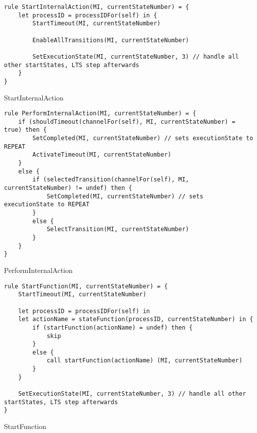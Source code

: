 \begin{listing}[H]
\begin{verbatim}
rule StartInternalAction(MI, currentStateNumber) = {
    let processID = processIDFor(self) in {
        StartTimeout(MI, currentStateNumber)

        EnableAllTransitions(MI, currentStateNumber)

        SetExecutionState(MI, currentStateNumber, 3) // handle all other startStates, LTS step afterwards
    }
}
\end{verbatim}
\caption{StartInternalAction}
\label{lst:asm:StartInternalAction}
\end{listing}




\begin{listing}[H]
\begin{verbatim}
rule PerformInternalAction(MI, currentStateNumber) = {
    if (shouldTimeout(channelFor(self), MI, currentStateNumber) = true) then {
        SetCompleted(MI, currentStateNumber) // sets executionState to REPEAT
        ActivateTimeout(MI, currentStateNumber)
    }
    else {
        if (selectedTransition(channelFor(self), MI, currentStateNumber) != undef) then {
            SetCompleted(MI, currentStateNumber) // sets executionState to REPEAT
        }
        else {
            SelectTransition(MI, currentStateNumber)
        }
    }
}
\end{verbatim}
\caption{PerformInternalAction}
\label{lst:asm:PerformInternalAction}
\end{listing}






\begin{listing}[H]
\begin{verbatim}
rule StartFunction(MI, currentStateNumber) = {
    StartTimeout(MI, currentStateNumber)

    let processID = processIDFor(self) in
    let actionName = stateFunction(processID, currentStateNumber) in {
        if (startFunction(actionName) = undef) then {
            skip
        }
        else {
            call startFunction(actionName) (MI, currentStateNumber)
        }
    }

    SetExecutionState(MI, currentStateNumber, 3) // handle all other startStates, LTS step afterwards
}
\end{verbatim}
\caption{StartFunction}
\label{lst:asm:StartFunction}
\end{listing}




